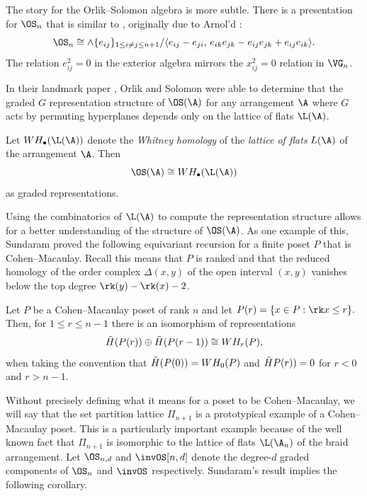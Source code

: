 \documentclass{amsart}
\begin{document}
The story for the Orlik--Solomon algebra is more subtle.
There is a presentation for $\OS_n$ that is similar to , originally due to Arnol'd \cite{arnold}:
\begin{equation}\label{eqn:OSPresentation}
    \OS_n \cong \wedge \{e_{ij}\}_{1 \leq i \neq j \leq n+1} / 
    \langle e_{ij} - e_{ji},\, e_{ik}e_{jk} - e_{ij}e_{jk} + e_{ij}e_{ik} \rangle.
\end{equation}
The relation $e_{ij}^2 = 0$ in the exterior algebra mirrors the $x_{ij}^2 = 0$ relation in $\VG_n$.

In their landmark paper \cite{orlik-solomon}, Orlik and Solomon were able to determine that the graded $G$ representation structure of $\OS(\A)$ for any arrangement $\A$ where $G$ acts by permuting hyperplanes depends only on the lattice of flats $\L(\A)$.

\begin{lemma}
    Let $WH_{\bullet}(\L(\A))$ denote the \textit{Whitney homology} of the \textit{lattice of flats} $L(\A)$ of the arrangement $\A$. 
    Then \[\OS(\A) \cong WH_{\bullet}(\L(\A))\] as graded representations.
\end{lemma}

Using the combinatorics of $\L(\A)$ to compute the representation structure allows for a better understanding of the structure of $\OS(\A)$.
As one example of this, Sundaram \cite{sundaram} proved the following equivariant recursion for a finite poset $P$ that is Cohen--Macaulay.
Recall this means that $P$ is ranked and that the reduced homology of the order complex $\Delta(x,y)$ of the open interval $(x,y)$ vanishes below the top degree $\rk(y)-\rk(x)-2$.

\begin{lemma}{\cite[Prop.~1.9]{sundaram}}
    Let $P$ be a Cohen--Macaulay poset of rank $n$ and let
    $P(r) = \{x \in P : \rk x \leq r\}.$
    Then, for $1\leq r \leq n - 1$ there is an isomorphism of representations
    \[\Tilde{H}(P(r)) \oplus \Tilde{H}(P(r-1)) \cong WH_r(P),\]
    when taking the convention that $\Tilde{H}(P(0))=WH_0(P)$ and $\Tilde{H}P(r))=0$ for $r < 0$ and $r > n-1$.
\end{lemma}

Without precisely defining what it means for a poset to be Cohen--Macaulay, we will say that the set partition lattice $\Pi_{n+1}$ is a prototypical example of a Cohen--Macaulay poset.
This is a particularly important example because of the well known fact that $\Pi_{n+1}$ is isomorphic to the lattice of flats $\L(\A_n)$ of the braid arrangement.
Let $\OS_{n,d}$ and $\invOS[n,d]$ denote the degree-$d$ graded components of $\OS_n$ and $\invOS$ respectively.
Sundaram's result implies the following corollary.
\end{document}

